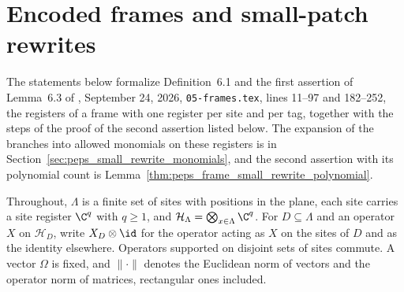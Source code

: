 \section{Encoded frames and small-patch rewrites}
\label{sec:peps_encoded_frames}
The statements below formalize Definition~6.1 and the first assertion of
Lemma~6.3 of \cite{OpenAI2026PolynomialPEPS}, September 24, 2026,
\texttt{05-frames.tex}, lines 11--97 and 182--252, the registers of a frame
with one register per site and per tag, together with the steps of the proof
of the second assertion listed below. The expansion of the branches into
allowed monomials on these registers is in
Section~\ref{sec:peps_small_rewrite_monomials}, and the second assertion with
its polynomial count is
Lemma~\ref{thm:peps_frame_small_rewrite_polynomial}.

Throughout, $\Lambda$ is a finite set of sites with positions in the plane,
each site carries a site register $\C^q$ with $q\ge1$, and
$\mathcal H_\Lambda=\bigotimes_{x\in\Lambda}\C^q$. For $D\subseteq\Lambda$ and
an operator $X$ on $\mathcal H_D$, write $X_D\otimes\id$ for the operator
acting as $X$ on the sites of $D$ and as the identity elsewhere. Operators
supported on disjoint sets of sites commute. A vector $\Omega$ is fixed, and
$\lVert\cdot\rVert$ denotes the Euclidean norm of vectors and the operator
norm of matrices, rectangular ones included.


